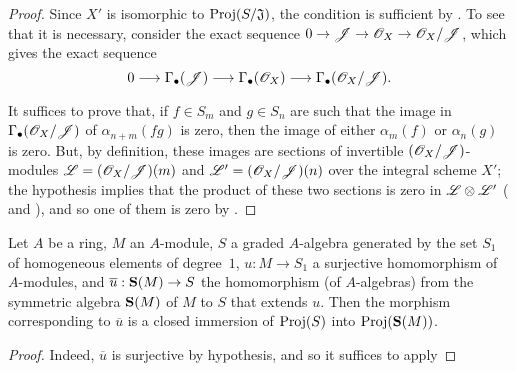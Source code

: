 
\begin{proof}
Since $X'$ is isomorphic to $\operatorname{Proj}(S/\mathfrak{J})$, the condition is sufficient by .
To see that it is necessary, consider the exact sequence $0\to\sh{J}\to\sh{O}_X\to\sh{O}_X/\sh{J}$, which gives the exact sequence
\[
  0 \to \Gamma_\bullet(\sh{J}) \to \Gamma_\bullet(\sh{O}_X) \to \Gamma_\bullet(\sh{O}_X/\sh{J}).
\]

It suffices to prove that, if $f\in S_m$ and $g\in S_n$ are such that the image in $\Gamma_\bullet(\mathscr{O}_X/\mathscr{J})$ of $\alpha_{n+m}(fg)$ is zero, then the image of either $\alpha_m(f)$ or $\alpha_n(g)$ is zero.
But, by definition, these images are sections of invertible $(\mathscr{O}_X/\mathscr{J})$-modules $\mathscr{L}=(\mathscr{O}_X/\mathscr{J})(m)$ and $\mathscr{L}'=(\mathscr{O}_X/\mathscr{J})(n)$ over the integral scheme $X'$;
the hypothesis implies that the product of these two sections is zero in $\mathscr{L}\otimes\mathscr{L}'$ ( and ), and so one of them is zero by .
\end{proof}

\begin{corollary}[2.9.5]
\label{II.2.9.5}
Let $A$ be a ring, $M$ an $A$-module, $S$ a graded $A$-algebra generated by the set $S_1$ of homogeneous elements of degree~$1$, $u:M\to S_1$ a surjective homomorphism of $A$-modules, and $\overline{u}:\bb{S}(M)\to S$ the homomorphism (of $A$-algebras) from the symmetric algebra $\mathbf{S}(M)$ of $M$ to $S$ that extends $u$.
Then the morphism corresponding to $\overline{u}$ is a closed immersion of $\operatorname{Proj}(S)$ into $\operatorname{Proj}(\mathbf{S}(M))$.
\end{corollary}

\begin{proof}
Indeed, $\overline{u}$ is surjective by hypothesis, and so it suffices to apply 
\end{proof}
